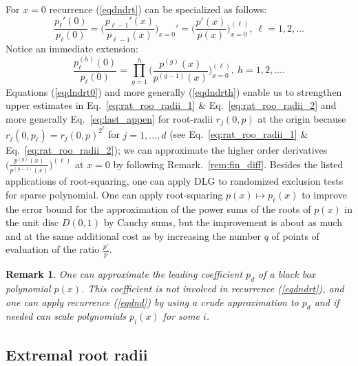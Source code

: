 \documentclass[sigconf]{acmart}
\newtheorem{remark}{Remark}
\begin{document}

For $x=0$ recurrence (\ref{eqdndrt}) can be specialized as follows:
 \begin{equation}\label{eqdndrt0} \frac{p_{{\ell}}'(0)}{p_{\ell}(0)}=\Big(\frac{p_{\ell-1}'(x)}{p_{\ell-1}(x)}\Big)_{x=0}'=\Big(\frac{p'(x)}{p(x)}\Big)_{x=0}^{(\ell)},~\ell=1,2,\dots
\end{equation}
Notice an immediate extension:
\begin{equation}\label{eqdndrth} \frac{p_{{\ell}}^{(h)}(0)}{p_{\ell}(0)}=\prod_{g=1}^h\Big(\frac{p^{(g)}(x)}{p^{(g-1)}(x)}\Big)_{x=0}^{(\ell)},~h=1,2,\dots.
\end{equation}
Equations (\ref{eqdndrt0}) and more generally (\ref{eqdndrth})
enable us to  strengthen
upper estimates in Eq.~\ref{eq:rat_roo_radii_1} \& Eq.~\ref{eq:rat_roo_radii_2}
and more generally Eq.~\ref{eq:last_appen} for root-radii $r_j(0,p)$   at the origin  because $r_j(0,p_{\ell})=r_j(0,p)^{2^{\ell}}$ for $j=1,\dots,d$ (see  Eq.~\ref{eq:rat_roo_radii_1} \& Eq.~\ref{eq:rat_roo_radii_2}); we can  approximate the higher order derivatives
$\Big(\frac{p^{(g)}(x)}{p^{(g-1)}(x)}\Big)^{(\ell)}$
 at $x=0$ by following Remark.~\ref{rem:fin_diff}.
Besides the listed applications of
root-squaring, one can apply DLG to randomized exclusion tests for sparse polynomial.
One can apply root-squaring $p(x)\mapsto p_{\ell}(x)$ to improve  the error bound for the approximation of the power sums of the roots of  $p(x)$ in the unit disc $D(0,1)$ by Cauchy sums, but the improvement is about as much and at the same additional cost as by increasing the number $q$ of points of evaluation of the ratio $\frac{p'}{p}$.
\begin{remark}\label{rescdnd}
 One can approximate the leading coefficient $p_d$  of a black box polynomial $p(x)$. This coefficient is not involved in recurrence (\ref{eqdndrt}),
 and one can apply  recurrence (\ref{eqdnd}) by using a crude
 approximation to  $p_d$
 and if needed can scale polynomials
 $p_i(x)$ for some $i$.
\end{remark}

\subsection{Extremal root radii}\label{sec:ext_root_rad}
\end{document}
